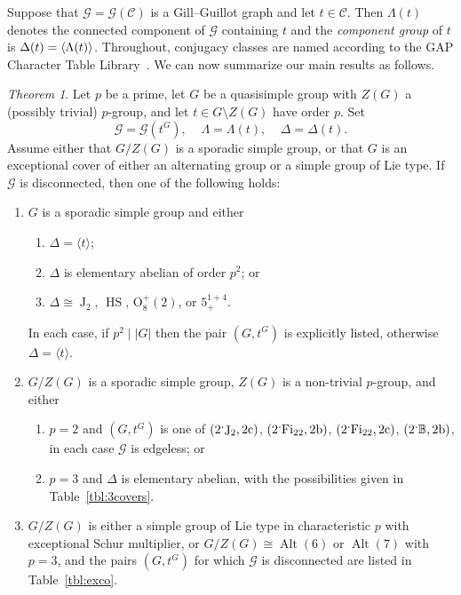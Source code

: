 \documentclass[11pt,a4paper]{amsart}
\theoremstyle{plain}
\theoremstyle{definition}
\theoremstyle{remark}
\newtheorem{theorem}[definition]{Theorem}
\theoremstyle{remark}
\theoremstyle{remark}
\theoremstyle{definition}
\newcommand{\ns}{\mathbin{\mspace{-4mu}\vcenter{\hbox{\raisebox{1ex}{$\cdot$}}}\mspace{-4mu}}}
\newcommand{\GG}{\mathcal{G}}
\newcommand{\BM}{\mathbb{B}}
\DeclareMathOperator{\HS}{HS}
\DeclareMathOperator{\J}{J}
\DeclareMathOperator{\Fi}{Fi}
\DeclareMathOperator{\Alt}{Alt}
\DeclarePairedDelimiter{\gen}{\langle}{\rangle}
\begin{document}
Suppose that $\GG=\GG(\mathcal{C})$ is a Gill--Guillot graph and let $t \in \mathcal C$. Then $\Lambda(t)$ denotes the connected component of $\GG$ containing $t$ and the \emph{component group} of $t$ is $\Delta(t)=\gen{\Lambda(t)}$. Throughout, conjugacy classes are named according to the {\sf GAP} Character Table Library~\cite{CTblLib1.3.11}. We can now summarize our main results as follows. 

\begin{theorem}\label{thm:mainresults}
Let $p$ be a prime, let $G$ be a quasisimple group with $Z(G)$ a (possibly trivial) $p$-group, and let $t\in G\setminus Z(G)$ have order $p$. Set
\[ \GG=\GG(t^G),\;\;\;\; \Lambda=\Lambda(t),\;\;\;\; \Delta=\Delta(t).\]
Assume either that $G/Z(G)$ is a sporadic simple group, or that $G$ is an exceptional cover of either an alternating group or a simple group of Lie type. If $\GG$ is disconnected, then one of the following holds:
\begin{enumerate}
\item[(a)] $G$ is a sporadic simple group and either
\begin{enumerate}
\item[(i)] $\Delta=\langle t\rangle$; %
\item[(ii)] $\Delta$ is elementary abelian of order $p^2$; or
\item[(iii)] $\Delta\cong \J_2,\, \HS,\, \mathrm{O}_8^+(2)$, or $5_+^{1+4}$.
\end{enumerate}
In each case, if $p^2\mid |G|$ then the pair $(G,t^{G})$ is explicitly listed, otherwise $\Delta=\langle t\rangle$.

\item[(b)] $G/Z(G)$ is a sporadic simple group, $Z(G) $ is a non-trivial $p$-group, and either
\begin{enumerate}
\item[(i)] $p=2$ and $(G,t^G)$ is one of $(2\ns\J_2,\mathrm{2c})$, $(2\ns\Fi_{22},\mathrm{2b})$, $(2\ns\Fi_{22},\mathrm{2c})$, $(2\ns\BM,\mathrm{2b})$, in each case $\GG$ is edgeless; or
\item[(ii)] $p=3$ and $\Delta$ is elementary abelian, with the possibilities given in Table~\ref{tbl:3covers}.
\end{enumerate}

\item[(c)] $G/Z(G)$ is either a simple group of Lie type in characteristic $p$ with exceptional Schur multiplier, or $G/Z(G)\cong \Alt(6)$ or $\Alt(7)$ with $p=3$, and the pairs $(G,t^G)$ for which $\GG$ is disconnected are listed in Table~\ref{tbl:exco}.
\end{enumerate}
\end{theorem}
\end{document}
